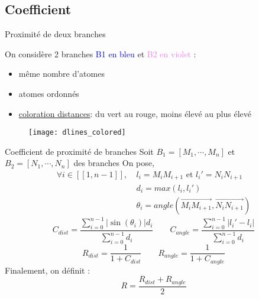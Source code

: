\subsection{Coefficient}
\begin{frame}{Proximité de deux branches}
    \footnotesize
    \begin{minipage}{0.47\textwidth}%
    On considère 2 branches \textcolor{blue}{B1 en bleu} et \textcolor{violet}{B2 en violet} :
    \begin{itemize}
    \item même nombre d'atomes
    \item atomes ordonnés
    \item \underline{coloration distances}:
    du vert au rouge, moins élevé au plus élevé
    \end{itemize}
    \end{minipage}%
    \hfill
    \begin{minipage}{0.51\textwidth}%
        \begin{figure}[!htb]
            \texttt{[image: dlines\_colored]}
        \end{figure}
    \end{minipage}%
\end{frame}

\begin{frame}{Coefficient de proximité de branches}
    \footnotesize
    Soit $B_1 = [M_1,\cdots,M_n]$ et $B_2 = [N_1,\cdots,N_n]$ des branches
    \newline On pose, 
    \begin{align*}
    \forall i \in [\![1,n-1]\!],\ & l_i = M_iM_{i+1} \text{ et } l_i' = N_iN_{i+1}\\
    & d_i = max(l_i,l_i') \\
    & \theta_i = angle(  \overrightarrow{M_iM_{i+1}} ,   \overrightarrow{N_iN_{i+1}} ) 
    \end{align*}
    \begin{equation*}
        C_{dist} = \frac{\displaystyle\sum_{i=0}^{n-1} | \sin(\theta_{i}) | d_i}{\displaystyle\sum_{i=0}^{n-1} d_i} \qquad  
        C_{angle} = \frac{\displaystyle\sum_{i=0}^{n-1} |l_i' - l_i|}{\displaystyle\sum_{i=0}^{n-1} d_i}
    \end{equation*}
    \begin{equation*}
        R_{dist} = \frac{1}{1 + C_{dist}} \qquad R_{angle} = \frac{1}{1 + C_{angle}}
    \end{equation*}
    \newline Finalement, on définit : \newline
    \begin{equation*}
        \boxed{R = \frac{R_{dist}+R_{angle}}{2}}
    \end{equation*}
\end{frame}

